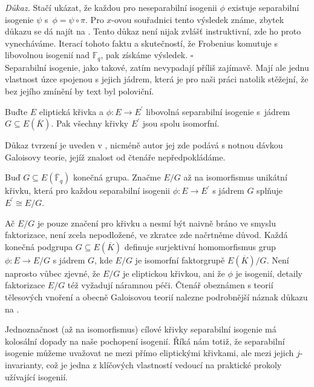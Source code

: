 \documentclass[12pt]{report}
\begin{document}
\noindent \textit{Důkaz.} Stačí ukázat, že každou pro neseparabilní isogenii $\phi$ existuje separabilní isogenie $\psi$ s~$\phi = \psi \circ \pi$. Pro $x$-ovou souřadnici tento výsledek známe, zbytek důkazu se dá najít na \cite[Lemma 6.3.]{Sutherland}. Tento důkaz není nijak zvlášť instruktivní, zde ho proto vynecháváme. Iterací tohoto faktu a skutečností, že Frobenius komutuje s libovolnou isogenií nad $\mathbb{F}_q$, pak získáme výsledek. \hfill $\square$\\

Separabilní isogenie, jako takové, zatím nevypadají příliš zajímavě. Mají ale jednu vlastnost úzce spojenou s jejich jádrem, která je pro naši práci natolik stěžejní, že bez jejího zmínění by text byl poloviční.

\begin{veta}\label{isomor}
Buďte $E$ eliptická křivka a $\phi : E \longrightarrow E^\prime$ libovolná separabilní isogenie s~jádrem $G \subseteq E(\overline{K})$. Pak všechny křivky $E^\prime$ jsou spolu isomorfní.
\end{veta}
Důkaz tvrzení je uveden v \cite[Prop. 12.12]{Washington}, nicméně autor jej zde podává s notnou dávkou Galoisovy teorie, jejíž znalost od čtenáře nepředpokládáme.

\begin{znaceni}
Buď $G \subseteq E(\overline{\mathbb{F}}_q)$ konečná grupa. Značme $E/G$ až na isomorfismus unikátní křivku, která pro každou separabilní isogenii $\phi : E \longrightarrow E^\prime$ s jádrem $G$ splňuje $E^\prime \cong E/G$.
\end{znaceni}

\begin{poznamka}
Ač $E/G$ je pouze značení pro křivku a nesmí být naivně bráno ve smyslu faktorizace, není zcela nepodložené, ve zkratce zde načrtněme důvod. Každá konečná podgrupa $G \subseteq E(\overline{K})$ definuje surjektivní homomorfismus grup $\phi : E \longrightarrow E/G$ s jádrem $G$, kde $E/G$ je isomorfní faktorgrupě $E(\overline{K})/G$. Není naprosto vůbec zjevné, že $E/G$ je eliptickou křivkou, ani že $\phi$ je isogenií, detaily faktorizace $E/G$ též vyžadují náramnou péči. Čtenář obeznámen s teorií tělesových vnoření a obecně Galoisovou teorií nalezne podrobnější náznak důkazu na \cite[Thm. 6.10.]{Sutherland}.
\end{poznamka}

Jednoznačnost (až na isomorfismus) cílové křivky separabilní isogenie má kolosální dopady na naše pochopení isogenií. Říká nám totiž, že separabilní isogenie můžeme uvažovat ne mezi přímo eliptickými křivkami, ale mezi jejich $j$-invarianty, což je jedna z klíčových vlastností vedoucí na praktické prokoly užívající isogenií.
\end{document}
